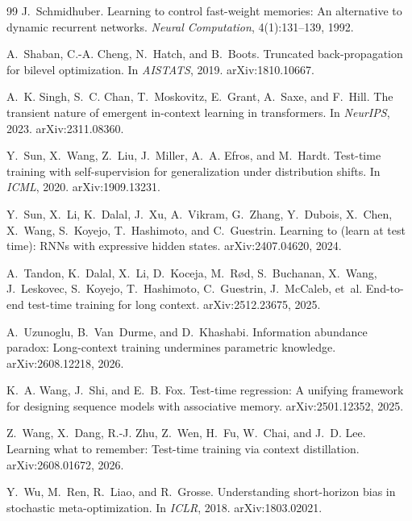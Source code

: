 \documentclass[11pt]{article}
\begin{document}
\begin{thebibliography}{99}
J.~Schmidhuber.
\newblock Learning to control fast-weight memories: An alternative to dynamic recurrent
  networks.
\newblock \emph{Neural Computation}, 4(1):131--139, 1992.

A.~Shaban, C.-A. Cheng, N.~Hatch, and B.~Boots.
\newblock Truncated back-propagation for bilevel optimization.
\newblock In \emph{AISTATS}, 2019. arXiv:1810.10667.

A.~K. Singh, S.~C. Chan, T.~Moskovitz, E.~Grant, A.~Saxe, and F.~Hill.
\newblock The transient nature of emergent in-context learning in transformers.
\newblock In \emph{NeurIPS}, 2023. arXiv:2311.08360.

Y.~Sun, X.~Wang, Z.~Liu, J.~Miller, A.~A. Efros, and M.~Hardt.
\newblock Test-time training with self-supervision for generalization under distribution shifts.
\newblock In \emph{ICML}, 2020. arXiv:1909.13231.

Y.~Sun, X.~Li, K.~Dalal, J.~Xu, A.~Vikram, G.~Zhang, Y.~Dubois, X.~Chen, X.~Wang, S.~Koyejo,
  T.~Hashimoto, and C.~Guestrin.
\newblock Learning to (learn at test time): {RNNs} with expressive hidden states.
\newblock arXiv:2407.04620, 2024.

A.~Tandon, K.~Dalal, X.~Li, D.~Koceja, M.~R{\o}d, S.~Buchanan, X.~Wang, J.~Leskovec, S.~Koyejo,
  T.~Hashimoto, C.~Guestrin, J.~McCaleb, et~al.
\newblock End-to-end test-time training for long context.
\newblock arXiv:2512.23675, 2025.

A.~Uzunoglu, B.~Van~Durme, and D.~Khashabi.
\newblock Information abundance paradox: Long-context training undermines parametric knowledge.
\newblock arXiv:2608.12218, 2026.

K.~A. Wang, J.~Shi, and E.~B. Fox.
\newblock Test-time regression: A unifying framework for designing sequence models with associative
  memory.
\newblock arXiv:2501.12352, 2025.

Z.~Wang, X.~Dang, R.-J. Zhu, Z.~Wen, H.~Fu, W.~Chai, and J.~D. Lee.
\newblock Learning what to remember: Test-time training via context distillation.
\newblock arXiv:2608.01672, 2026.

Y.~Wu, M.~Ren, R.~Liao, and R.~Grosse.
\newblock Understanding short-horizon bias in stochastic meta-optimization.
\newblock In \emph{ICLR}, 2018. arXiv:1803.02021.


\end{thebibliography}
\end{document}
